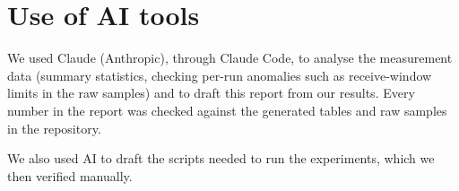 \documentclass[10pt]{article}
\begin{document}
\clearpage
\section{Use of AI tools}

We used Claude (Anthropic), through Claude Code, to analyse the measurement data (summary statistics, checking per-run anomalies such as receive-window limits in the raw samples) and to draft this report from our results. Every number in the report was checked against the generated tables and raw samples in the repository.

We also used AI to draft the scripts needed to run the experiments, which we then verified manually.
\end{document}
